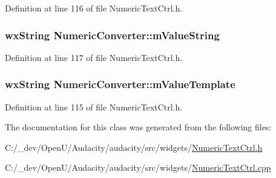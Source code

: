 Definition at line 116 of file Numeric\+Text\+Ctrl.\+h.

\subsubsection[{\texorpdfstring{m\+Value\+String}{mValueString}}]{\setlength{\rightskip}{0pt plus 5cm}wx\+String Numeric\+Converter\+::m\+Value\+String\hspace{0.3cm}{\ttfamily [protected]}}\hypertarget{class_numeric_converter_ac8edd92e89a3f4055b4d85bfc1901dd4}{}\label{class_numeric_converter_ac8edd92e89a3f4055b4d85bfc1901dd4}


Definition at line 117 of file Numeric\+Text\+Ctrl.\+h.

\subsubsection[{\texorpdfstring{m\+Value\+Template}{mValueTemplate}}]{\setlength{\rightskip}{0pt plus 5cm}wx\+String Numeric\+Converter\+::m\+Value\+Template\hspace{0.3cm}{\ttfamily [protected]}}\hypertarget{class_numeric_converter_a64ceed9482d254e37fbe217496747dce}{}\label{class_numeric_converter_a64ceed9482d254e37fbe217496747dce}


Definition at line 115 of file Numeric\+Text\+Ctrl.\+h.



The documentation for this class was generated from the following files\+:\begin{DoxyCompactItemize}
\item 
C\+:/\+\_\+dev/\+Open\+U/\+Audacity/audacity/src/widgets/\hyperlink{_numeric_text_ctrl_8h}{Numeric\+Text\+Ctrl.\+h}\item 
C\+:/\+\_\+dev/\+Open\+U/\+Audacity/audacity/src/widgets/\hyperlink{_numeric_text_ctrl_8cpp}{Numeric\+Text\+Ctrl.\+cpp}\end{DoxyCompactItemize}

